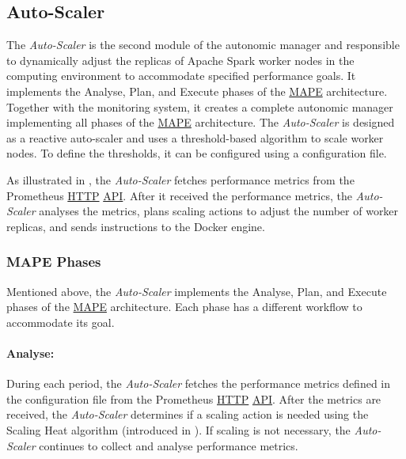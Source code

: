 \subsection{Auto-Scaler}
The \textit{Auto-Scaler} is the second module of the autonomic manager and responsible to dynamically adjust the replicas of Apache Spark worker nodes in the computing environment to accommodate specified performance goals. 
It implements the Analyse, Plan, and Execute phases of the \hyperlink{abbr:mape}{MAPE} architecture. Together with the monitoring system, it creates a complete autonomic manager implementing all phases of the \hyperlink{abbr:mape}{MAPE} architecture.
The \textit{Auto-Scaler} is designed as a reactive auto-scaler and uses a threshold-based algorithm to scale worker nodes. To define the thresholds, it can be configured using a configuration file.


As illustrated in , the \textit{Auto-Scaler} fetches performance metrics from the Prometheus \hyperlink{abbr:http}{HTTP} \hyperlink{abbr:api}{API}.
After it received the performance metrics, the \textit{Auto-Scaler} analyses the metrics, plans scaling actions to adjust the number of worker replicas, and sends instructions to the Docker engine.


\subsubsection{MAPE Phases}
Mentioned above, the \textit{Auto-Scaler} implements the Analyse, Plan, and Execute phases of the \hyperlink{abbr:mape}{MAPE} architecture. Each phase has a different workflow to accommodate its goal.

\paragraph{Analyse:}
During each period, the \textit{Auto-Scaler} fetches the performance metrics defined in the configuration file from the Prometheus \hyperlink{abbr:http}{HTTP} \hyperlink{abbr:api}{API}.
After the metrics are received, the \textit{Auto-Scaler} determines if a scaling action is needed using the Scaling Heat algorithm (introduced in ). If scaling is not necessary, the \textit{Auto-Scaler} continues to collect and analyse performance metrics.

